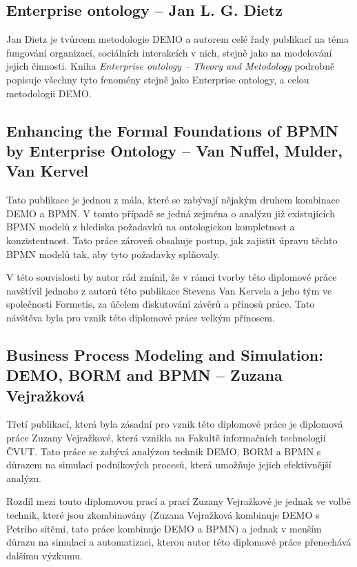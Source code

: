 \subsection{Enterprise ontology – Jan L. G. Dietz}
Jan Dietz je tvůrcem metodologie DEMO a autorem celé řady publikací na téma fungování organizací, sociálních interakcích v nich, stejně jako na modelování jejich činnosti. Kniha \textit{Enterprise ontology – Theory and Metodology} podrobně popisuje všechny tyto fenomény stejně jako Enterprise ontology, \ptheory{} a celou metodologii DEMO.

\subsection{Enhancing the Formal Foundations of BPMN by Enterprise Ontology – Van Nuffel, Mulder, Van Kervel}
Tato publikace je jednou z mála, které se zabývají nějakým druhem kombinace DEMO a BPMN. V tomto případě se jedná zejména o analýzu již existujících BPMN modelů z hlediska požadavků na ontologickou kompletnost a konzistentnost. Tato práce zároveň obsahuje postup, jak zajistit úpravu těchto BPMN modelů tak, aby tyto požadavky splňovaly.

V této souvislosti by autor rád zmínil, že v rámci tvorby této diplomové práce navštívil jednoho z autorů této publikace Stevena Van Kervela a jeho tým ve společnosti Formetis, za účelem diskutování závěrů a přínosů práce. Tato návštěva byla pro vznik této diplomové práce velkým přínosem.

\subsection{Business Process Modeling and Simulation: DEMO, BORM and BPMN – Zuzana Vejražková}
Třetí publikací, která byla zásadní pro vznik této diplomové práce je diplomová práce Zuzany Vejražkové, která vznikla na Fakultě informačních technologií ČVUT. Tato práce se zabývá analýzou technik DEMO, BORM a BPMN s důrazem na simulaci podnikových procesů, která umožňuje jejich efektivnější analýzu.

Rozdíl mezi touto diplomovou prací a prací Zuzany Vejražkové je jednak ve volbě technik, které jsou zkombinovány (Zuzana Vejražková kombinuje DEMO s Petriho sítěmi, tato práce kombinuje DEMO a BPMN) a jednak v menším důrazu na simulaci a automatizaci, kterou autor této diplomové práce přenechává dalšímu výzkumu.